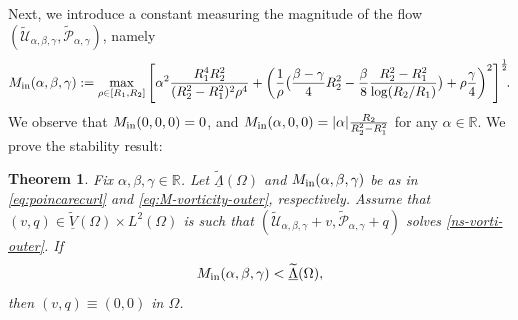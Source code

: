 \documentclass[a4paper,11pt]{amsart}
\newtheorem{theorem}{Theorem}[section]
\numberwithin{equation}{section}
\numberwithin{figure}{section}
\def\U{{\mathcal U}}
\def\P{{\mathcal P}}
\begin{document}
Next, we introduce a constant measuring the magnitude of the flow $(\widetilde\U_{\alpha,\beta,\gamma},\widetilde\P_{\alpha,\gamma})$, namely
\begin{equation}\label{eq:M-vorticity-outer}
	{M}_{\rm in}(\alpha,\beta,\gamma):= \max_{\rho\in[R_1,R_2]}\left[\alpha^2 \frac{R_1^4R_2^2}{(R_2^2 -R_1^2)^2\rho^4} +\left(\frac{1}{\rho}\big(\frac{\beta-\gamma}{4}R_2^2-\frac{\beta}{8}\frac{R_2^2-R_1^2}{\log(R_2/R_1)}\big)+\rho\frac{\gamma}{4} \right)^2\right]^{\frac{1}{2}}\!\!.
\end{equation}
We observe that ${M}_{\rm in}(0,0,0)=0$, and ${M}_{\rm in}(\alpha,0,0)=|\alpha|\frac{R_2}{R_2^2-R_1^2}$ for any $\alpha\in\mathbb{R}$. We prove the stability result:

\begin{theorem}\label{theo:unrestuniquevortouter}
	Fix $\alpha,\beta,\gamma\in\mathbb{R}$. Let $\underline{\widetilde{\Lambda}}(\Omega)$ and ${M}_{\rm in}(\alpha,\beta,\gamma)$ be as in \eqref{eq:poincarecurl} and \eqref{eq:M-vorticity-outer}, respectively. Assume that $(v,q)\in \underline{\widetilde V}(\Omega)\times L^2(\Omega)$ is such that $(\widetilde\U_{\alpha,\beta,\gamma}+v,\widetilde\P_{\alpha,\gamma}+q)$ solves \eqref{ns-vorti-outer}. If
	\begin{equation}\label{uniqueness-cond-vort-outer}
		{M}_{\rm in}(\alpha,\beta,\gamma)<\underline{\widetilde{\Lambda}}(\Omega),
	\end{equation}
	then $(v,q)\equiv (0,0)$ in $\Omega$.
\end{theorem}
\end{document}
